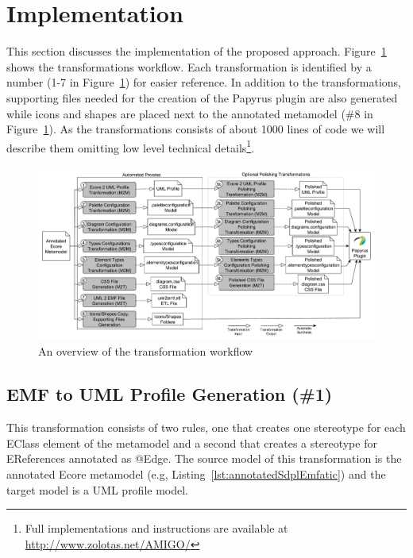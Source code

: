 \section{Implementation}
\label{sec:implementation}
This section discusses the implementation of the proposed approach. Figure~\ref{fig:transformationWorkflow} shows the transformations workflow. Each transformation is identified by a number (1-7 in Figure~\ref{fig:transformationWorkflow}) for easier reference. In addition to the transformations, supporting files needed for the creation of the Papyrus plugin are also generated while icons and shapes are placed next to the annotated metamodel (\#8 in Figure~\ref{fig:transformationWorkflow}). As the transformations consists of about 1000 lines of code we will describe them omitting low level technical details\footnote{Full implementations and instructions are available at \url{http://www.zolotas.net/AMIGO/}}. 

\begin{figure}[t]
	\centering
	\includegraphics[width=\textwidth]{diagrams/transformationWorkflow.pdf}
	\caption[]{An overview of the transformation workflow}
	\label{fig:transformationWorkflow}
	
	\vspace*{-3mm}
\end{figure}

\subsection{EMF to UML Profile Generation (\#1)}
\label{sec:profileGeneration}
This transformation consists of two rules, one that creates one stereotype for each EClass element of the metamodel and a second that creates a stereotype for EReferences annotated as @Edge. The source model of this transformation is the annotated Ecore metamodel (e.g,  Listing~\ref{lst:annotatedSdplEmfatic}) and the target model is a UML profile model.

